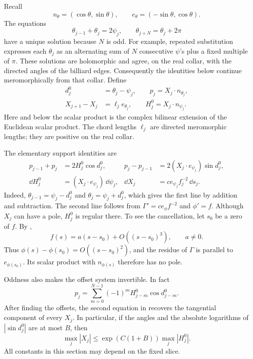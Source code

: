 Recall
\[
 n_\theta=(\cos\theta,\sin\theta),\qquad
 e_\theta=(-\sin\theta,\cos\theta).
\]
The equations
\begin{equation}
 \theta_{j-1}+\theta_j=2\psi_j,
 \qquad \theta_{j+N}=\theta_j+2\pi
 \label{odd:angle-system}
\end{equation}
have a unique solution because \(N\) is odd.  For example, repeated
substitution expresses each \(\theta_j\) as an alternating sum of \(N\)
consecutive \(\psi\)'s plus a fixed multiple of \(\pi\).  These solutions
are holomorphic and agree, on the real collar, with the directed angles of
the billiard edges.  Consequently the identities below continue
meromorphically from that collar.  Define
\begin{equation}
 \begin{split}
 d_j^0&=\theta_j-\psi_j,\qquad
 p_j=X_j\cdot n_{\theta_j},\\
 X_{j+1}-X_j&=\ell_j e_{\theta_j},\qquad
 H_j^0=X_j\cdot n_{\psi_j}.
 \end{split}
 \label{odd:edge-data}
\end{equation}
Here and below the scalar product is the complex bilinear extension of the
Euclidean scalar product.  The chord lengths \(\ell_j\) are directed
meromorphic lengths; they are positive on the real collar.

The elementary support identities are
\begin{align}
 p_{j-1}+p_j&=2H_j^0\cos d_j^0,
 &p_j-p_{j-1}&=2(X_j\cdot e_{\psi_j})\sin d_j^0,
 \label{odd:offset-system}\\
 \dd H_j^0&=(X_j\cdot e_{\psi_j})\,\dd\psi_j,
 &\dd X_j&=c e_{\psi_j}f_j^{-2}\,\dd s_j.
 \label{odd:support-differentials}
\end{align}
Indeed, \(\theta_{j-1}=\psi_j-d_j^0\) and
\(\theta_j=\psi_j+d_j^0\), which gives the first line by addition and
subtraction.  The second line follows from
\(\Gamma'=c e_\phi f^{-2}\) and \(\phi'=f\).
Although \(X_j\) can have a pole, \(H_j^0\) is regular there.  To see the
cancellation, let \(s_0\) be a zero of \(f\).  By ,
\[
 f(s)=a(s-s_0)+O((s-s_0)^3),\qquad a\ne0.
\]
Thus \(\phi(s)-\phi(s_0)=O((s-s_0)^2)\), and the residue of \(\Gamma\)
is parallel to \(e_{\phi(s_0)}\).  Its scalar product with
\(n_{\phi(s)}\) therefore has no pole.

Oddness also makes the offset system invertible.  In fact
\[
 p_j=\sum_{m=0}^{N-1}(-1)^m H_{j-m}^0\cos d_{j-m}^0.
\]
After finding the offsets, the second equation in
 recovers the tangential component of every
\(X_j\).  In particular, if the angles and the absolute logarithms of
\(|\sin d_j^0|\) are at most \(B\), then
\begin{equation}
 \max_j|X_j|\le \exp(C(1+B))\max_j|H_j^0|.
 \label{odd:reconstruction}
\end{equation}
All constants in this section may depend on the fixed slice.

